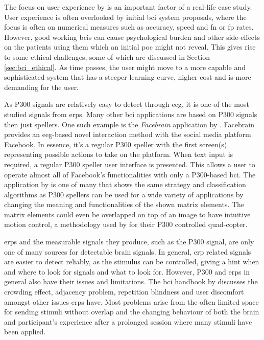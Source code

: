 The focus on user experience by \citet{p300_speller_real_life2} is an important factor of a real-life case study.
User experience is often overlooked by initial \gls{bci} system proposals, where the focus is often on numerical measures such as accuracy, speed and \gls{fn} or \gls{fp} rates.
However, good working \glspl{bci} can cause psychological burden and other side-effects on the patients using them which an initial \gls{poc} might not reveal.
This gives rise to some ethical challenges, some of which are discussed in Section \ref{sec:bci_ethical}.
As time passes, the user might move to a more capable and sophisticated system that has a steeper learning curve, higher cost and is more demanding for the user.

As P300 signals are relatively easy to detect through \gls{eeg}, it is one of the most studied signals from \glspl{erp}.
Many other \gls{bci} applications are based on P300 signals then just spellers.
One such example is the \textit{Facebrain} application by \citet{facebrain}.
Facebrain provides an \gls{eeg}-based novel interaction method with the social media platform Facebook.
In essence, it's a regular P300 speller with the first screen(s) representing possible actions to take on the platform.
When text input is required, a regular P300 speller user interface is presented.
This allows a user to operate almost all of Facebook's functionalities with only a P300-based \gls{bci}.
The application by \citet{facebrain} is one of many that shows the same strategy and classification algorithms as P300 spellers can be used for a wide variety of applications by changing the meaning and functionalities of the shown matrix elements.
The matrix elements could even be overlapped on top of an image to have intuitive motion control, a methodology used by \citet{p300_drone} for their P300 controlled quad-copter.

\glspl{erp} and the measurable signals they produce, such as the P300 signal, are only one of many sources for detectable brain signals.
In general, \gls{erp} related signals are easier to detect reliably, as the stimulus can be controlled, giving a hint when and where to look for signals and what to look for.
However, P300 and \glspl{erp} in general also have their issues and limitations.
The \gls{bci} handbook by \citet[Chapter~26]{bci_handbook} discusses the crowding effect, adjacency problem, repetition blindness and user discomfort amongst other issues \glspl{erp} have.
Most problems arise from the often limited space for sending stimuli without overlap and the changing behaviour of both the brain and participant's experience after a prolonged session where many stimuli have been applied.

